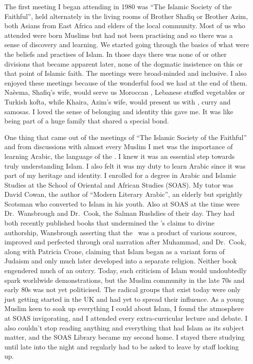 \documentclass[12pt]{memoir}
\begin{document}
The first meeting I began attending in 1980 was
“The Islamic Society of the Faithful”,
held alternately in the living rooms of Brother Shafiq or Brother Azim,
both Asians from East Africa and elders of the local community.
Most of us who attended were born Muslims but had not been practising
and so there was a sense of discovery and learning.
We started going through the basics of what were the beliefs
and practises of Islam.
In those days there was none of 
or other divisions that became apparent later,
none of the dogmatic insistence on this or that point of Islamic faith.
The meetings were broad-minded and inclusive.
I also enjoyed these meetings because of the wonderful food
we had at the end of them.
Na\`eema, Shafiq’s wife, would serve us Moroccan ,
Lebanese stuffed vegetables or Turkish kofta, while Khaira, Azim’s wife,
would present us with , curry and samosas.
I loved the sense of belonging and identity this gave me.
It was like being part of a huge family that shared a special bond.

One thing that came out of the meetings of
“The Islamic Society of the Faithful”
and from discussions with almost every Muslim I met
was the importance of learning Arabic, the language of the \Quran.
I knew it was an essential step towards truly understanding Islam.
I also felt it was my duty to learn Arabic
since it was part of my heritage and identity.
I enrolled for a degree in Arabic and Islamic Studies
at the School of Oriental and African Studies (SOAS).
My tutor was David Cowan, the author of “Modern Literary Arabic”,
an elderly but sprightly Scotsman who converted to Islam in his youth.
Also at SOAS at the time were Dr.\ Wansbrough and Dr.\ Cook,
the Salman Rushdies of their day.
They had both recently published books that undermined
the \Quran’s claims to divine authorship,
Wansbrough asserting that the \Quran\ was a product of various sources,
improved and perfected through oral narration after Muhammad,
and Dr.\ Cook, along with Patricia Crone,
claiming that Islam began as a variant form of Judaism
and only much later developed into a separate religion.
Neither book engendered much of an outcry.
Today, such criticism of Islam would undoubtedly
spark worldwide demonstrations,
but the Muslim community in the late 70s and early 80s was not yet politicised.
The radical groups that exist today were only just getting started in the UK
and had yet to spread their influence.
As a young Muslim keen to soak up everything I could about Islam,
I found the atmosphere at SOAS invigorating,
and I attended every extra-curricular lecture and debate.
I also couldn’t stop reading anything
and everything that had Islam as its subject matter,
and the SOAS Library became my second home.
I stayed there studying until late into the night
and regularly had to be asked to leave by staff locking up.
\end{document}
